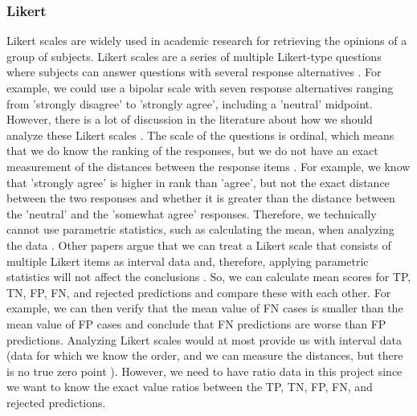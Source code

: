 \subsubsection{Likert}
\label{sec:likert}
Likert scales are widely used in academic research for retrieving the opinions of a group of subjects.
%
Likert scales are a series of multiple Likert-type questions where subjects can answer questions with several response alternatives \citep{boone2012analyzing}.
%
For example, we could use a bipolar scale with seven response alternatives ranging from 'strongly disagree' to 'strongly agree', including a 'neutral' midpoint.
%
However, there is a lot of discussion in the literature about how we should analyze these Likert scales \citep{boone2012analyzing, allen2007likert, norman2010likert, murray2013likert}.
%
The scale of the questions is ordinal, which means that we do know the ranking of the responses, but we do not have an exact measurement of the distances between the response items \citep{allen2007likert}.
%
For example, we know that 'strongly agree' is higher in rank than 'agree', but not the exact distance between the two responses and whether it is greater than the distance between the 'neutral' and the 'somewhat agree' responses.
%
Therefore, we technically cannot use parametric statistics, such as calculating the mean, when analyzing the data \citep{allen2007likert}.
%
Other papers argue that we can treat a Likert scale that consists of multiple Likert items as interval data and, therefore, applying parametric statistics will not affect the conclusions \citep{boone2012analyzing, norman2010likert, murray2013likert}.
%
So, we can calculate mean scores for TP, TN, FP, FN, and rejected predictions and compare these with each other.
%
For example, we can then verify that the mean value of FN cases is smaller than the mean value of FP cases and conclude that FN predictions are worse than FP predictions.
%
Analyzing Likert scales would at most provide us with interval data (data for which we know the order, and we can measure the distances, but there is no true zero point \citep{allen2007likert}).
%
However, we need to have ratio data in this project since we want to know the exact value ratios between the TP, TN, FP, FN, and rejected predictions.

